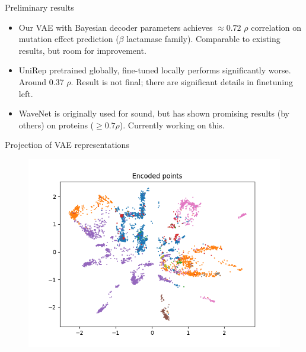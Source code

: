 \documentclass[dvipsnames]{beamer}
\begin{document}
\begin{frame}{Preliminary results}
    \begin{itemize}
        \item Our VAE with Bayesian decoder parameters achieves $\approx 0.72$ $\rho$ correlation on mutation effect prediction ($\beta$ lactamase family). Comparable to existing results, but room for improvement.
        \item UniRep pretrained globally, fine-tuned locally performs significantly worse. Around 0.37 $\rho$. Result is not final; there are significant details in finetuning left.
        \item WaveNet is originally used for sound, but has shown promising results (by others) on proteins ($\geq 0.7 \rho$). Currently working on this.
    \end{itemize}
\end{frame}

\begin{frame}{Projection of VAE representations}
\begin{figure}
    \centering
    \includegraphics[width=0.9\linewidth]{presentation/vae.png}
\end{figure}
    
\end{frame}
\end{document}
